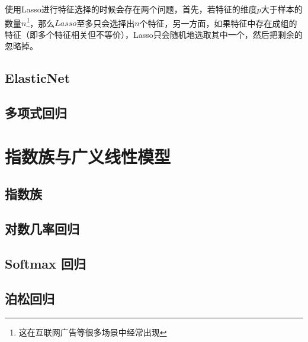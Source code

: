 使用Lasso进行特征选择的时候会存在两个问题，首先，若特征的维度$p$大于样本的数量$n$\footnote{这在互联网广告等很多场景中经常出现}，那么$Lasso$至多只会选择出$n$个特征，另一方面，如果特征中存在成组的特征（即多个特征相关但不等价），Lasso只会随机地选取其中一个，然后把剩余的忽略掉。




\subsection{ElasticNet} %
\label{sub:elasticnet}



\subsection{多项式回归} %
\label{sub:多项式回归}



\section{指数族与广义线性模型} %
\label{sec:指数族与广义线性模型}
\subsection{指数族} %
\label{sub:指数族}

\subsection{对数几率回归} %
\label{sub:对数几率回归}


\subsection{Softmax 回归} %
\label{sub:softmax_回归}


\subsection{泊松回归} %
\label{sub:泊松回归}


